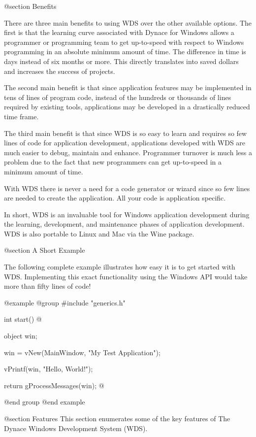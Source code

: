 @section Benefits

There are three main benefits to using WDS over the other available
options.  The first is that the learning curve associated with Dynace
for Windows allows a programmer or programming team to get up-to-speed
with respect to Windows programming in an absolute minimum amount of
time.  The difference in time is days instead of six months or more.
This directly translates into saved dollars and increases the success of
projects.

The second main benefit is that since application features may be
implemented in tens of lines of program code, instead of the hundreds or
thousands of lines required by existing tools, applications may be
developed in a drastically reduced time frame.

The third main benefit is that since WDS is so easy to learn and
requires so few lines of code for application development, applications
developed with WDS are much easier to debug, maintain and enhance.
Programmer turnover is much less a problem due to the fact that new
programmers can get up-to-speed in a minimum amount of time.

With WDS there is never a need for a code generator or wizard since
so few lines are needed to create the application.  All your code
is application specific.

In short, WDS is an invaluable tool for Windows application development
during the learning, development, and maintenance phases of application
development.  WDS is also portable to Linux and Mac via the Wine package.

@section A Short Example

The following complete example illustrates how easy it is to get started
with WDS.  Implementing this exact functionality using the Windows API
would take more than fifty lines of code!

@example
@group
#include "generics.h"

int     start()
@{
        object  win;

        win = vNew(MainWindow, "My Test Application");

        vPrintf(win, "Hello, World!\n");

        return gProcessMessages(win);
@}
@end group
@end example



@section Features
This section enumerates some of the key features of The Dynace Windows
Development System (WDS).

